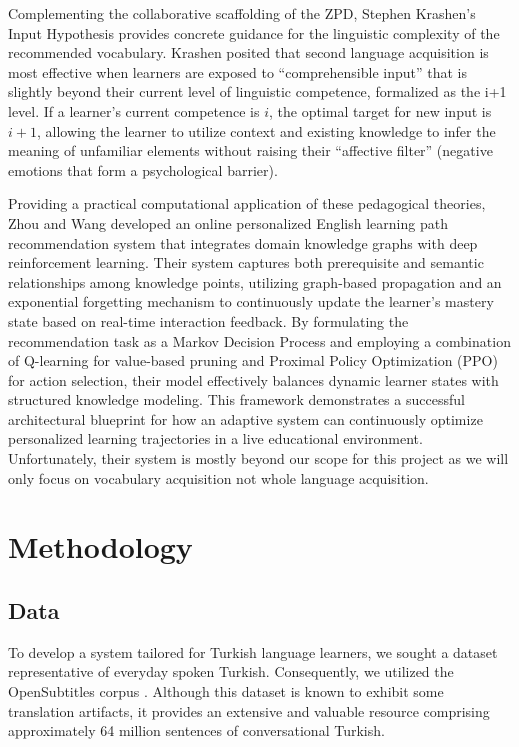 \documentclass{article}
\begin{document}
Complementing the collaborative scaffolding of the ZPD, Stephen Krashen's Input Hypothesis\cite{krashen1977monitor} provides concrete guidance for the linguistic complexity of the recommended vocabulary. Krashen posited that second language acquisition is most effective when learners are exposed to ``comprehensible input'' that is slightly beyond their current level of linguistic competence, formalized as the i+1 level. If a learner's current competence is $i$, the optimal target for new input is $i+1$, allowing the learner to utilize context and existing knowledge to infer the meaning of unfamiliar elements without raising their ``affective filter'' (negative emotions that form a psychological barrier).

Providing a practical computational application of these pedagogical theories, Zhou and Wang\cite{zhou2025simulation} developed an online personalized English learning path recommendation system that integrates domain knowledge graphs with deep reinforcement learning. Their system captures both prerequisite and semantic relationships among knowledge points, utilizing graph-based propagation and an exponential forgetting mechanism to continuously update the learner's mastery state based on real-time interaction feedback. By formulating the recommendation task as a Markov Decision Process and employing a combination of Q-learning for value-based pruning and Proximal Policy Optimization (PPO) for action selection, their model effectively balances dynamic learner states with structured knowledge modeling. This framework demonstrates a successful architectural blueprint for how an adaptive system can continuously optimize personalized learning trajectories in a live educational environment. Unfortunately, their system is mostly beyond our scope for this project as we will only focus on vocabulary acquisition not whole language acquisition.

\section{Methodology}

\subsection{Data}
To develop a system tailored for Turkish language learners, we sought a dataset representative of everyday spoken Turkish. Consequently, we utilized the OpenSubtitles corpus \cite{lison-tiedemann-2016-opensubtitles2016}. Although this dataset is known to exhibit some translation artifacts, it provides an extensive and valuable resource comprising approximately 64 million sentences of conversational Turkish.
\end{document}
